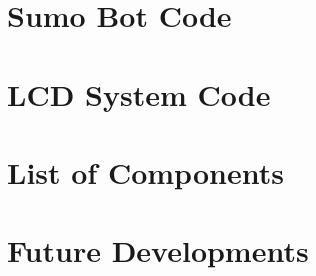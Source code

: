 \documentclass[11pt, letterpaper, oneside]{article}
\begin{document}
\newpage
\section{Sumo Bot Code}

\newpage
\section{LCD System Code}

\newpage
\section{List of Components}

\newpage
\section{Future Developments}
\end{document}
